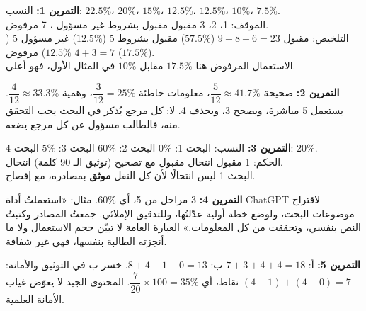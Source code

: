 \documentclass[a4paper]{article}
\begin{document}
\newpage
{}

\textbf{التمرين 1:}
النسب: $22.5\%$، $20\%$، $15\%$، $12.5\%$، $12.5\%$، $10\%$، $7.5\%$.\\
الموقف: 1، 2، 3 مقبول  مقبول بشروط  غير مسؤول ، 7 مرفوض.\\
التلخيص: مقبول $9+8+6 = 23$ ($57.5\%$) \quad مقبول بشروط 5 ($12.5\%$) \quad
غير مسؤول 5 ($12.5\%$) \quad مرفوض $4+3 = 7$ ($17.5\%$).\\
الاستعمال المرفوض هنا $17.5\%$ مقابل $10\%$ في المثال الأول، فهو أعلى.

\textbf{التمرين 2:}
صحيحة $\dfrac{5}{12} \approx 41.7\%$، معلومات خاطئة $\dfrac{3}{12} = 25\%$،
وهمية $\dfrac{4}{12} \approx 33.3\%$.
يستعمل 5 مباشرة، ويصحح 3، ويحذف 4.
لا: كل مرجع يُذكر في البحث يجب التحقق منه، فالطالب مسؤول عن كل مرجع يضعه.

\textbf{التمرين 3:}
النسب: البحث 1: $0\%$ \quad البحث 2: $60\%$ \quad البحث 3: $5\%$ \quad البحث 4: $20\%$.\\
الحكم: 1 مقبول  انتحال  مقبول مع تصحيح (توثيق الـ 90 كلمة)  انتحال.\\
البحث 1 ليس انتحالًا لأن كل النقل \textbf{موثق} بمصادره، مع إفصاح.

\textbf{التمرين 4:}
3 مراحل من 5، أي $60\%$.
مثال: «استعملتُ أداة \textenglish{ChatGPT} لاقتراح موضوعات البحث، ولوضع خطة أولية عدّلتُها،
وللتدقيق الإملائي. جمعتُ المصادر وكتبتُ النص بنفسي، وتحققت من كل المعلومات.»
العبارة العامة لا تبيّن حجم الاستعمال ولا ما أنجزته الطالبة بنفسها، فهي غير شفافة.

\textbf{التمرين 5:}
أ: $7+3+4+4 = 18$ \quad ب: $8+4+1+0 = 13$.
خسر ب في التوثيق والأمانة: $(4-1) + (4-0) = 7$ نقاط، أي $\dfrac{7}{20}\times 100 = 35\%$.
المحتوى الجيد لا يعوّض غياب الأمانة العلمية.
\end{document}

